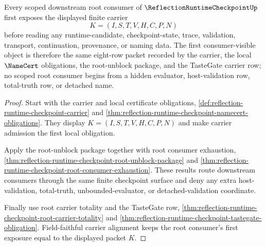 \begin{theorem}
\label{thm:reflection-runtime-checkpoint-scoped-carrier-exposure}
Every scoped downstream root consumer of $\ReflectionRuntimeCheckpointUp$ first exposes the displayed finite carrier
$$
K=(I,S,T,V,H,C,P,N)
$$
before reading any runtime-candidate, checkpoint-state, trace, validation, transport, continuation, provenance, or naming data. The first consumer-visible object is therefore the same eight-row packet recorded by the carrier, the local $\NameCert$ obligations, the root-unblock package, and the TasteGate carrier row; no scoped root consumer begins from a hidden evaluator, host-validation row, total-truth row, or detached name.
\end{theorem}
\begin{proof}
Start with the carrier and local certificate obligations, \autoref{def:reflection-runtime-checkpoint-carrier} and \autoref{thm:reflection-runtime-checkpoint-namecert-obligations}. They display $K=(I,S,T,V,H,C,P,N)$ and make carrier admission the first local obligation.

Apply the root-unblock package together with root consumer exhaustion, \autoref{thm:reflection-runtime-checkpoint-root-unblock-package} and \autoref{thm:reflection-runtime-checkpoint-root-consumer-exhaustion}. These results route downstream consumers through the same finite checkpoint surface and deny any extra host-validation, total-truth, unbounded-evaluator, or detached-validation coordinate.

Finally use root carrier totality and the TasteGate row, \autoref{thm:reflection-runtime-checkpoint-root-carrier-totality} and \autoref{thm:reflection-runtime-checkpoint-tastegate-obligation}. Field-faithful carrier alignment keeps the root consumer's first exposure equal to the displayed packet $K$.
\end{proof}

